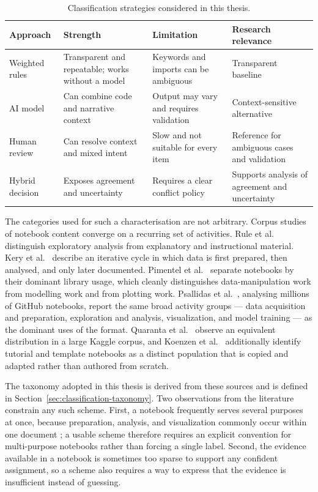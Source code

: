 \begin{table}[ht]
\centering
\caption{Classification strategies considered in this thesis.}
\label{tab:classification-approaches}
\small
\begin{tabularx}{\textwidth}{@{}p{2.7cm}XXX@{}}
\toprule
Approach & Strength & Limitation & Research relevance\tabularnewline
\midrule
Weighted rules & Transparent and repeatable; works without a model & Keywords and imports can be ambiguous & Transparent baseline\tabularnewline
AI model & Can combine code and narrative context & Output may vary and requires validation & Context-sensitive alternative\tabularnewline
Human review & Can resolve context and mixed intent & Slow and not suitable for every item & Reference for ambiguous cases and validation\tabularnewline
Hybrid decision & Exposes agreement and uncertainty & Requires a clear conflict policy & Supports analysis of agreement and uncertainty\tabularnewline
\bottomrule
\end{tabularx}
\end{table}

The categories used for such a characterisation are not arbitrary. Corpus studies of notebook content converge on a recurring set of activities. Rule et al.~\cite{rule2018} distinguish exploratory analysis from explanatory and instructional material. Kery et al.~\cite{kery2018} describe an iterative cycle in which data is first prepared, then analysed, and only later documented. Pimentel et al.~\cite{pimentel2019} separate notebooks by their dominant library usage, which cleanly distinguishes data-manipulation work from modelling work and from plotting work. Psallidas et al.~\cite{psallidas2022datascience}, analysing millions of GitHub notebooks, report the same broad activity groups --- data acquisition and preparation, exploration and analysis, visualization, and model training --- as the dominant uses of the format. Quaranta et al.~\cite{quaranta2021kgtorrent} observe an equivalent distribution in a large Kaggle corpus, and Koenzen et al.~\cite{koenzen2020duplication} additionally identify tutorial and template notebooks as a distinct population that is copied and adapted rather than authored from scratch.

The taxonomy adopted in this thesis is derived from these sources and is defined in Section~\ref{sec:classification-taxonomy}. Two observations from the literature constrain any such scheme. First, a notebook frequently serves several purposes at once, because preparation, analysis, and visualization commonly occur within one document \cite{rule2018,kery2018}; a usable scheme therefore requires an explicit convention for multi-purpose notebooks rather than forcing a single label. Second, the evidence available in a notebook is sometimes too sparse to support any confident assignment, so a scheme also requires a way to express that the evidence is insufficient instead of guessing.

